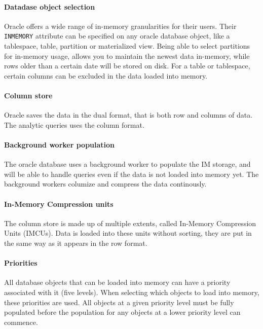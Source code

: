 \paragraph{Datadase object selection}
\label{par:Datadase object selection}
Oracle offers a wide range of in-memory granularities for their users. Their \texttt{INMEMORY} attribute can be specified on any oracle database object, like a tablespace, table, partition or materialized view. Being able to select partitions for in-memory usage, allows you to maintain the newest data in-memory, while rows older than a certain date will be stored on disk. For a table or tablespace, certain columns can be excluded in the data loaded into memory.


\paragraph{Column store}
\label{par:Column store}
Oracle saves the data in the dual format, that is both row and columns of data. The analytic queries uses the column format.

\paragraph{Background worker population}
\label{par:Background worker population}
The oracle database uses a background worker to populate the IM storage, and will be able to handle queries even if the data is not loaded into memory yet. The background workers columize and compress the data continously.

\paragraph{In-Memory Compression units}
\label{par:In-Memory Compression units}
The column store is made up of multiple extents, called In-Memory Compression Units (IMCUs). Data is loaded into these units without sorting, they are put in the same way as it appears in the row format.

\paragraph{Priorities}
\label{par:Priorities}
All database objects that can be loaded into memory can have a priority associated with it (five levels). When selecting which objects to load into memory, these priorities are used. All objects at a given priority level must be fully populated before the population for any objects at a lower priority level can commence.

